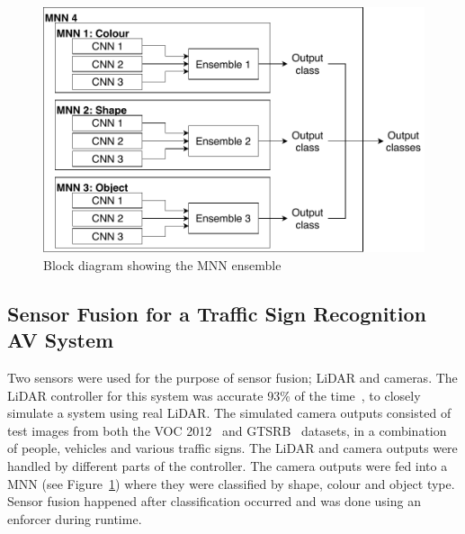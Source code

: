 \begin{figure}[h]
	\centering
	\includegraphics[scale=0.9]{Content/fig/MNN.pdf}
	\caption{Block diagram showing the \acf{MNN} ensemble} \label{fig:mnn}
\end{figure}

\subsection{Sensor Fusion for a Traffic Sign Recognition AV System}
Two sensors were used for the purpose of sensor fusion; \ac{LiDAR} and cameras.
The \ac{LiDAR} controller for this system was accurate 93\% of the time~\cite{lidarFusion}, to closely simulate a system using real \ac{LiDAR}.
The simulated camera outputs consisted of test images from both the \ac{VOC} 2012~\cite{pascal-voc-2012} and \ac{GTSRB}~\cite{Stallkamp2012-gtsrb} datasets, in a combination of people, vehicles and various traffic signs.
The \ac{LiDAR} and camera outputs were handled by different parts of the controller.
The camera outputs were fed into a \ac{MNN} (see Figure~\ref{fig:mnn}) where they were classified by shape, colour and object type.
Sensor fusion happened after classification occurred and was done using an enforcer during runtime.

